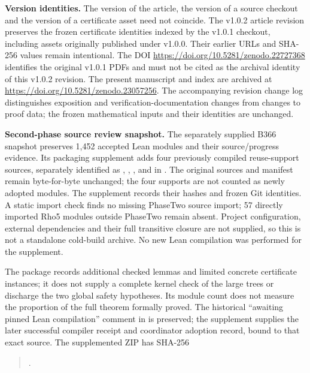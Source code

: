 \documentclass[10pt]{article}
\begin{document}
\textbf{Version identities.}
The version of the article, the version of a source checkout and the
version of a certificate asset need not coincide. The v1.0.2 article
revision preserves the frozen certificate identities indexed by the
v1.0.1 checkout, including assets originally published under
v1.0.0. Their earlier URLs and SHA-256 values remain intentional.
The DOI \url{https://doi.org/10.5281/zenodo.22727368} identifies the
original v1.0.1 PDFs and must not be cited as the archival identity of
this v1.0.2 revision. The present manuscript and index are archived at
\url{https://doi.org/10.5281/zenodo.23057256}. The accompanying revision change log distinguishes exposition and
verification-documentation changes from changes to proof data; the
frozen mathematical inputs and their identities are unchanged.

\textbf{Second-phase source review snapshot.}
The separately supplied B366 snapshot preserves 1,452 accepted Lean
modules and their source/progress evidence. Its packaging supplement
adds four previously compiled reuse-support sources, separately
identified as , ,
, and  in
.
The original sources and manifest remain byte-for-byte unchanged;
the four supports are not counted as newly adopted modules.
The supplement records their hashes and frozen Git identities.
A static import check finds no missing PhaseTwo source import;
57 directly imported Rho5 modules outside PhaseTwo remain absent.
Project configuration, external dependencies and their full transitive
closure are not supplied, so this is not a standalone cold-build
archive. No new Lean compilation was performed for the supplement.

The package records additional checked lemmas and limited concrete
certificate instances; it does not supply a complete kernel check of
the large trees or discharge the two global safety hypotheses.
Its module count does not measure the proportion of the full theorem
formally proved. The historical ``awaiting pinned Lean compilation''
comment in  is preserved; the
supplement supplies the later successful compiler receipt and
coordinator adoption record, bound to that exact source.
The supplemented ZIP has SHA-256
\begin{quote}
.
\end{quote}
\end{document}
